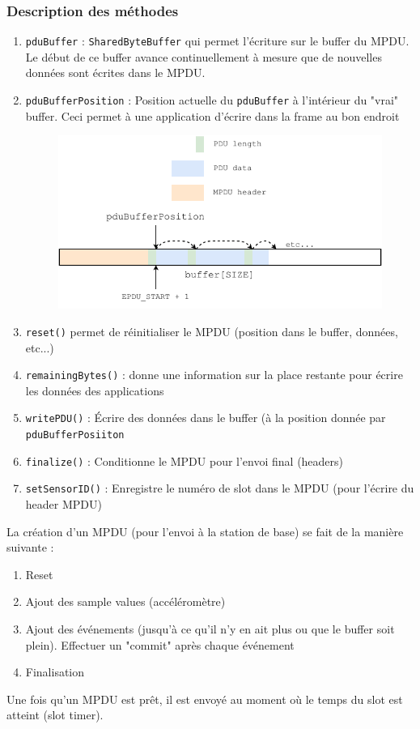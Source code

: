 \documentclass[DeseNET_Sebastien_Deriaz]{subfiles}
\begin{document}
\subsubsection{Description des méthodes}
\begin{enumerate}
\item \verb!pduBuffer! : \verb!SharedByteBuffer! qui permet l'écriture sur le buffer du MPDU. Le début de ce buffer avance continuellement à mesure que de nouvelles données sont écrites dans le MPDU.
\item \verb!pduBufferPosition! : Position actuelle du \verb!pduBuffer! à l'intérieur du "vrai" buffer. Ceci permet à une application d'écrire dans la frame au bon endroit
\begin{figure}[H]
\centering
\includegraphics[scale=1]{drwg_0.pdf}
\end{figure}
\item \verb!reset()! permet de réinitialiser le MPDU (position dans le buffer, données, etc...)
\item \verb!remainingBytes()! : donne une information sur la place restante pour écrire les données des applications
\item \verb!writePDU()! : Écrire des données dans le buffer (à la position donnée par \verb!pduBufferPosiiton!
\item \verb!finalize()! : Conditionne le MPDU pour l'envoi final (headers)
\item \verb!setSensorID()! : Enregistre le numéro de slot dans le MPDU (pour l'écrire du header MPDU)
\end{enumerate}
La création d'un MPDU (pour l'envoi à la station de base) se fait de la manière suivante :
\begin{enumerate}
\item Reset
\item Ajout des sample values (accéléromètre)
\item Ajout des événements (jusqu'à ce qu'il n'y en ait plus ou que le buffer soit plein). Effectuer un "commit" après chaque événement
\item Finalisation
\end{enumerate}
Une fois qu'un MPDU est prêt, il est envoyé au moment où le temps du slot est atteint (slot timer).\\
\end{document}
